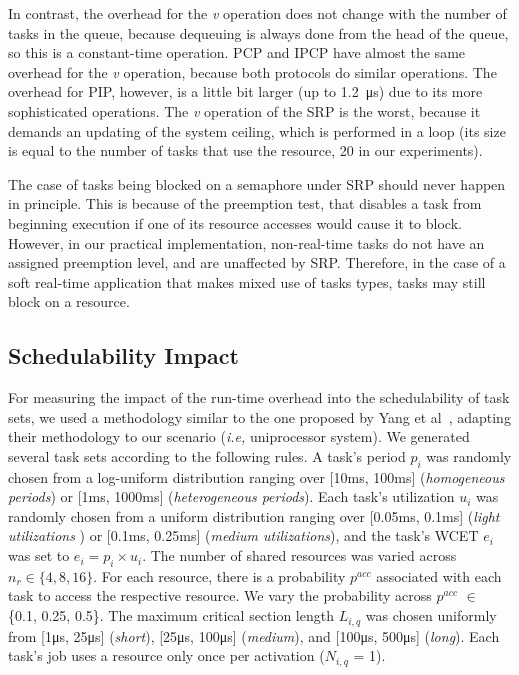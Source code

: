 
In contrast, the overhead for the \textit{v} operation does not change with the 
number of tasks in the queue, because dequeuing is always done from the head of 
the queue, so this is a constant-time operation. PCP and IPCP have almost the 
same overhead for the \emph{v} operation, because both protocols do similar 
operations. The overhead for PIP, however, is a little bit larger (up to 
1.2~\si{\micro\second}) due to its more sophisticated operations. The \emph{v} 
operation of the SRP is the worst, because it demands an updating of the system 
ceiling, which is performed in a loop (its size is equal to the number of 
tasks that use the resource, 20 in our experiments). 

The case of tasks being blocked on a semaphore under SRP should never happen in 
principle. This is because of the preemption test, that disables a task from 
beginning execution if one of its resource accesses would cause it to block. 
However, in our practical implementation, non-real-time tasks do not have an 
assigned preemption level, and are unaffected by SRP. Therefore, in the case of 
a soft real-time application that makes mixed use of tasks types, tasks may 
still block on a resource.

\subsection{Schedulability Impact}

For measuring the impact of the run-time overhead into the schedulability of 
task sets, we used a methodology similar to the one proposed 
by Yang et al~\cite{Yang:2015}, adapting their 
methodology to our scenario (\emph{i.e,} uniprocessor system). We generated 
several task sets according to the following rules. A task's period $p_i$ was 
randomly chosen from a log-uniform distribution ranging over 
[10\si{\milli\second}, 100\si{\milli\second}] (\emph{homogeneous periods}) or 
[1\si{\milli\second}, 1000\si{\milli\second}] (\emph{heterogeneous periods}). 
Each task's utilization $u_i$ was randomly chosen from a uniform distribution 
ranging over [0.05\si{\milli\second}, 0.1\si{\milli\second}] (\emph{light 
utilizations }) or [0.1\si{\milli\second}, 0.25\si{\milli\second}] 
(\emph{medium 
utilizations}), and the task's WCET $e_i$ was set to $e_i = p_i \times u_i$. 
The number of shared resources was varied across $n_r \in \{4, 8, 16\}$. For 
each resource, there is a probability $p^{acc}$ associated with each task to 
access the respective resource. We vary the probability across $p^{acc}$ $\in$ 
\{0.1, 0.25, 0.5\}. The maximum critical section length $L_{i,q}$ was chosen 
uniformly from [1\si{\micro\second}, 25\si{\micro\second}] (\emph{short}), 
[25\si{\micro\second}, 100\si{\micro\second}] (\emph{medium}), and 
[100\si{\micro\second}, 500\si{\micro\second}] (\emph{long}).  Each task's job 
uses a resource only once per activation ($N_{i,q}$ = 1). 


